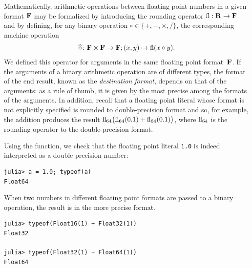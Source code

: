 Mathematically,
arithmetic operations between floating point numbers in a given format $\mathbf F$ may be formalized by introducing
the rounding operator ${\rm fl}: \mathbf R \to \mathbf F$ and
by defining, for any binary operation $\circ \in \{+, -, \times, /\}$,
the corresponding machine operation
\[
    \widehat \circ\colon \mathbf F \times \mathbf F \rightarrow \mathbf F; (x, y) \mapsto {\rm fl}(x \circ y).
\]
We defined this operator for arguments in the same floating point format~$\mathbf F$.
If the arguments of a binary arithmetic operation are of different types,
the format of the end result,
known as the \emph{destination format},
depends on that of the arguments:
as a rule of thumb,
it is given by the most precise among the formats of the arguments.
In addition, recall that a floating point literal whose format is not explicitly specified is rounded to double-precision format
and so, for example, the addition  produces the result ${\rm fl_{64}}\bigl(\rm fl_{64}(0.1) + \rm fl_{64}(0.1)\bigr)$,
where ${\rm fl}_{64}$ is the rounding operator to the double-precision format.

\begin{example}
    Using the  function,
    we check that the floating point literal \texttt{1.0} is indeed interpreted as a double-precision number:
\begin{verbatim}
julia> a = 1.0; typeof(a)
Float64
\end{verbatim}
When two numbers in different floating point formats are passed to a binary operation,
the result is in the more precise format.
\begin{verbatim}
julia> typeof(Float16(1) + Float32(1))
Float32

julia> typeof(Float32(1) + Float64(1))
Float64
\end{verbatim}
\end{example}

